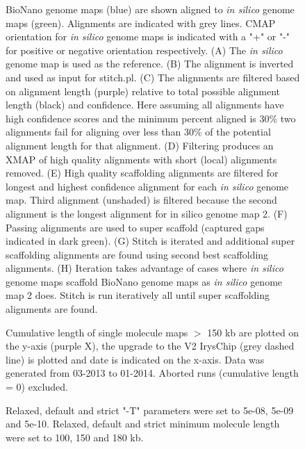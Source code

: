 \documentclass{bmcart}
\begin{document}
\begin{backmatter}
\begin{figure}[h!]
{      BioNano genome maps (blue) are shown aligned to \textit{in silico} genome maps (green). Alignments are indicated with grey lines. CMAP orientation for \textit{in silico} genome maps is indicated with a "+" or "-" for positive or negative orientation respectively. (A) The \textit{in silico} genome map is used as the reference. (B) The alignment is inverted and used as input for stitch.pl. (C) The alignments are filtered based on alignment length (purple) relative to total possible alignment length (black) and confidence. Here assuming all alignments have high confidence scores and the minimum percent aligned is 30\% two alignments fail for aligning over less than 30\% of the potential alignment length for that alignment. (D) Filtering produces an XMAP of high quality alignments with short (local) alignments removed. (E) High quality scaffolding alignments are filtered for longest and highest confidence alignment for each \textit{in silico} genome map. Third alignment (unshaded) is filtered because the second alignment is the longest alignment for {in silico} genome map 2. (F) Passing alignments are used to super scaffold (captured gaps indicated in dark green). (G) Stitch is iterated and additional super scaffolding alignments are found using second best scaffolding alignments. (H) Iteration takes advantage of cases where \textit{in silico} genome maps scaffold BioNano genome maps as \textit{in silico} genome map 2 does. Stitch is run iteratively all until super scaffolding alignments are found.}
      \end{figure} 
\begin{figure}[h!]
	\caption{
 Cumulative length of single molecule maps $>$ 150 kb are plotted on the y-axis (purple X), the upgrade to the V2 IrysChip (grey dashed line) is plotted and date is indicated on the x-axis. Data was generated from 03-2013 to 01-2014. Aborted runs (cumulative length = 0) excluded. }
\end{figure}
\begin{figure}[h!]
	\caption{
 Relaxed, default and strict "-T" parameters were set to 5e-08, 5e-09 and 5e-10. Relaxed, default and strict minimum molecule length were set to 100, 150 and 180 kb.}
\end{figure}     
\begin{figure}[h!]
	\caption{
}
\end{figure}
\end{backmatter}
\end{document}
